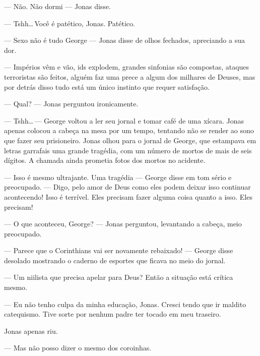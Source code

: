 --- Não. Não dormi --- Jonas disse.

--- Tshh\ldots\,Você é patético, Jonas. Patético.

--- Sexo não é tudo George --- Jonas disse de olhos fechados, apreciando a sua dor.

--- Impérios vêm e vão, ids explodem, grandes sinfonias são compostas, ataques terroristas são feitos, alguém faz uma prece a algum dos milhares de Deuses, mas\mudanca{,} por detrás disso tudo\mudanca{,} está um único instinto que requer satisfação.

--- Qual? --- Jonas perguntou\mudanca{,} ironicamente.

--- Tshh\ldots\,--- George voltou a ler seu jornal e tomar café de uma xícara. Jonas apenas colocou a cabeça na mesa por um tempo, tentando não se render ao sono que  fazer seu prisioneiro. Jonas olhou para o jornal de George, que estampava em letras garrafais uma grande tragédia, com um número de mortos de mais de seis dígitos. A chamada ainda prometia fotos dos mortos no acidente.

--- Isso é mesmo ultrajante. Uma tragédia --- George disse\mudanca{,} em tom sério e preocupado. --- Digo, pelo amor de Deus\mudanca{,} como eles podem deixar isso continuar acontecendo! Isso é terrível. Eles precisam fazer alguma coisa quanto a isso. Eles precisam!

--- O que aconteceu, George? --- Jonas perguntou, levantando a cabeça, meio preocupado.

--- Parece que o Corinthians vai ser novamente rebaixado! --- George disse\mudanca{,} desolado\mudanca{,} mostrando o caderno de esportes\mudanca{,} que ficava no meio do jornal.

--- Um niilista que precisa apelar para Deus? Então a situação está crítica mesmo.

--- Eu não tenho culpa da minha educação, Jonas. Cresci tendo que ir  maldito catequismo. Tive sorte por nenhum padre ter tocado em meu traseiro.

Jonas apenas riu.

--- Mas não posso dizer o mesmo dos coroinhas.
